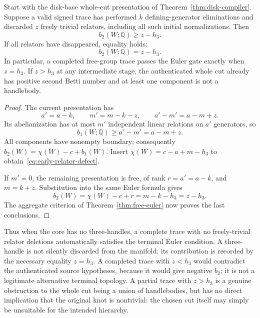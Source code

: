 \begin{theorem}
\label{thm:relator-ledger}
Start with the disk-base whole-cut presentation of
Theorem~\ref{thm:disk-compiler}.  Suppose a valid signed trace has
performed $k$ defining-generator eliminations and discarded $z$ freely
trivial relators, including all such initial normalizations.  Then
\begin{equation}
 b_2(W;\mathbb Q)\geq z-h_3.
 \label{eq:early-relator-defect}
\end{equation}
If all relators have disappeared, equality holds:
\begin{equation}
 b_2(W;\mathbb Q)=z-h_3.
 \label{eq:complete-relator-defect}
\end{equation}
In particular, a completed free-group trace passes the Euler gate
exactly when $z=h_3$.  If $z>h_3$ at any intermediate stage, the
authenticated whole cut already has positive second Betti number and
at least one component is not a handlebody.
\end{theorem}
\begin{proof}
The current presentation has
\[
 a'=a-k,\qquad m'=m-k-z,
 \qquad a'-m'=a-m+z.
\]
Its abelianization has at most $m'$ independent linear relations on $a'$
generators, so
\[
 b_1(W;\mathbb Q)\geq a'-m'=a-m+z.
\]
All components have nonempty boundary; consequently
$b_2(W)=\chi(W)-c+b_1(W)$.  Insert
$\chi(W)=c-a+m-h_3$ to obtain~\eqref{eq:early-relator-defect}.

If $m'=0$, the remaining presentation is free, of rank
$r=a'=a-k$, and $m=k+z$.  Substitution into the same Euler formula gives
\[
 b_2(W)=\chi(W)-c+r=m-k-h_3=z-h_3.
\]
The aggregate criterion of Theorem~\ref{thm:free-euler} now proves the
last conclusions.
\end{proof}

Thus when the core has no three-handles, a complete trace with no
freely-trivial relator deletions automatically satisfies the terminal
Euler condition.  A three-handle is not silently discarded from the
manifold: its contribution is recorded by the necessary equality
$z=h_3$.  A completed trace with $z<h_3$ would contradict the authenticated
source hypotheses, because it would give negative $b_2$; it is not a
legitimate alternative terminal topology.  A partial trace with
$z>h_3$ is a genuine obstruction to the whole cut being a union of
handlebodies, but has no direct implication that the original knot is
nontrivial: the chosen cut itself may simply be unsuitable for the
intended hierarchy.

